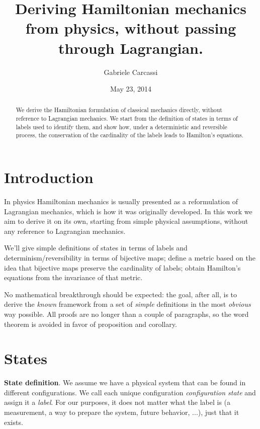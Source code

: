 \documentclass[twocolumn,floatfix,nofootinbib]{revtex4}   %
\theoremstyle{theorem}
\theoremstyle{definition}
\begin{document}
\title{Deriving Hamiltonian mechanics from physics, without passing through Lagrangian.}
\author{Gabriele Carcassi}
\date{May 23, 2014}

\begin{abstract}
We derive the Hamiltonian formulation of classical mechanics directly, without reference to Lagrangian mechanics.
We start from the definition of states in terms of labels used to identify them, and show how, under a deterministic and
reversible process, the conservation of the cardinality of the labels leads to Hamilton's equations.\end{abstract}

\maketitle

\section{Introduction}
In physics Hamiltonian mechanics is usually presented as a reformulation of Lagrangian mechanics, which is how it was originally developed. In this work we aim to derive it on its own, starting from simple physical assumptions, without any reference to Lagrangian mechanics.

We'll give simple definitions of states in terms of labels and determinism/reversibility in terms of bijective maps; define a metric based on the idea that bijective maps preserve the cardinality of labels; obtain Hamilton's equations from the invariance of that metric.

No mathematical breakthrough should be expected: the goal, after all, is to derive the \emph{known} framework from a set of \emph{simple} definitions in the most \emph{obvious} way possible. All proofs are no longer than a couple of paragraphs, so the word theorem is avoided in favor of proposition and corollary.

\section{States}
\textbf{State definition}. We assume we have a physical system that can be found in different configurations. We call each unique configuration \emph{configuration state} and assign it a \emph{label}. For our purposes, it does not matter what the label is (a measurement, a way to prepare the system, future behavior, ...), just that it exists.
\end{document}
